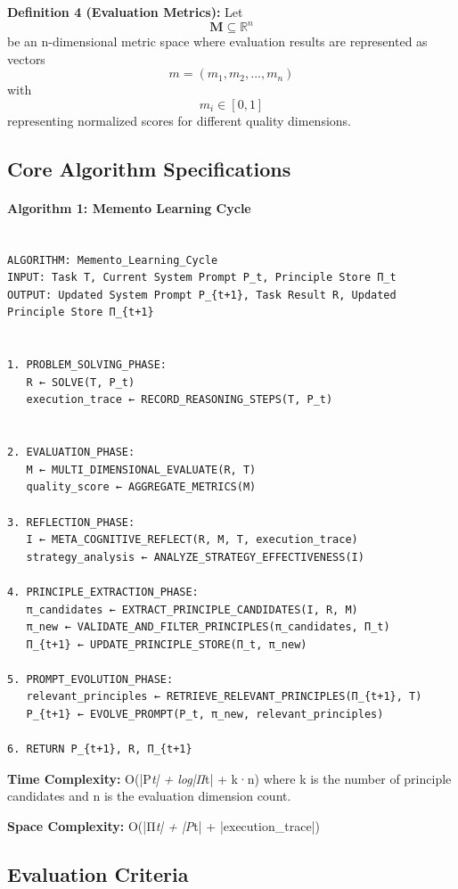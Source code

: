 \documentclass[10pt,a4paper,twocolumn]{article}
\begin{document}
\textbf{Definition 4 (Evaluation Metrics):} Let 
\[\textbf{M} \subseteq \mathbb{R}^n\] be an n-dimensional metric space where evaluation results are represented as vectors \[m = (m_1, m_2, ..., m_n)\] with \[m_i \in [0,1]\] representing normalized scores for different quality dimensions.

\subsection{Core Algorithm Specifications}

\paragraph{Algorithm 1: Memento Learning Cycle}


\begin{lstlisting}

ALGORITHM: Memento_Learning_Cycle
INPUT: Task T, Current System Prompt P_t, Principle Store Π_t
OUTPUT: Updated System Prompt P_{t+1}, Task Result R, Updated Principle Store Π_{t+1}


1. PROBLEM_SOLVING_PHASE:
   R ← SOLVE(T, P_t)
   execution_trace ← RECORD_REASONING_STEPS(T, P_t)

   
2. EVALUATION_PHASE:
   M ← MULTI_DIMENSIONAL_EVALUATE(R, T)
   quality_score ← AGGREGATE_METRICS(M)
   
3. REFLECTION_PHASE:
   I ← META_COGNITIVE_REFLECT(R, M, T, execution_trace)
   strategy_analysis ← ANALYZE_STRATEGY_EFFECTIVENESS(I)
   
4. PRINCIPLE_EXTRACTION_PHASE:
   π_candidates ← EXTRACT_PRINCIPLE_CANDIDATES(I, R, M)
   π_new ← VALIDATE_AND_FILTER_PRINCIPLES(π_candidates, Π_t)
   Π_{t+1} ← UPDATE_PRINCIPLE_STORE(Π_t, π_new)
   
5. PROMPT_EVOLUTION_PHASE:
   relevant_principles ← RETRIEVE_RELEVANT_PRINCIPLES(Π_{t+1}, T)
   P_{t+1} ← EVOLVE_PROMPT(P_t, π_new, relevant_principles)
   
6. RETURN P_{t+1}, R, Π_{t+1}

\end{lstlisting}

\textbf{Time Complexity:} O(|P\textit{t| + log|Π}t| + k·n) where k is the number of principle candidates and n is the evaluation dimension count.

\textbf{Space Complexity:} O(|Π\textit{t| + |P}t| + |execution\_trace|)



\subsection{Evaluation Criteria}
\end{document}
